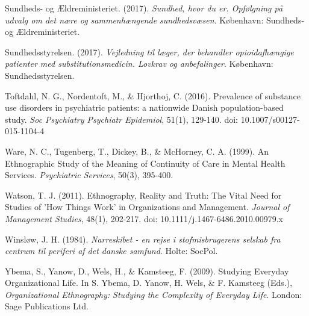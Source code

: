 \begin{thebibliography}{99}
\item Sundheds- og Ældreministeriet. (2017). \textit{Sundhed, hvor du er. Opfølgning på udvalg om det nære og sammenhængende sundhedsvæsen}. København: Sundheds- og Ældreministeriet.
\item Sundhedsstyrelsen. (2017). \textit{Vejledning til læger, der behandler opioidafhængige patienter med substitutionsmedicin. Lovkrav og anbefalinger}. København: Sundhedsstyrelsen.
\item Toftdahl, N. G., Nordentoft, M., \& Hjorthoj, C. (2016). Prevalence of substance use disorders in psychiatric patients: a nationwide Danish population-based study. \textit{Soc Psychiatry Psychiatr Epidemiol}, 51(1), 129-140. doi: 10.1007/s00127-015-1104-4
\item Ware, N. C., Tugenberg, T., Dickey, B., \& McHorney, C. A. (1999). An Ethnographic Study of the Meaning of Continuity of Care in Mental Health Services. \textit{Psychiatric Services}, 50(3), 395-400. 
\item Watson, T. J. (2011). Ethnography, Reality and Truth: The Vital Need for Studies of 'How Things Work' in Organizations and Management. \textit{Journal of Management Studies}, 48(1), 202-217. doi: 10.1111/j.1467-6486.2010.00979.x
\item Winsløw, J. H. (1984). \textit{Narreskibet - en rejse i stofmisbrugerens selskab fra centrum til periferi af det danske samfund}. Holte: SocPol.
\item Ybema, S., Yanow, D., Wels, H., \& Kamsteeg, F. (2009). Studying Everyday Organizational Life. In S. Ybema, D. Yanow, H. Wels, \& F. Kamsteeg (Eds.), \textit{Organizational Ethnography: Studying the Complexity of Everyday Life}. London: Sage Publications Ltd.

\end{thebibliography}